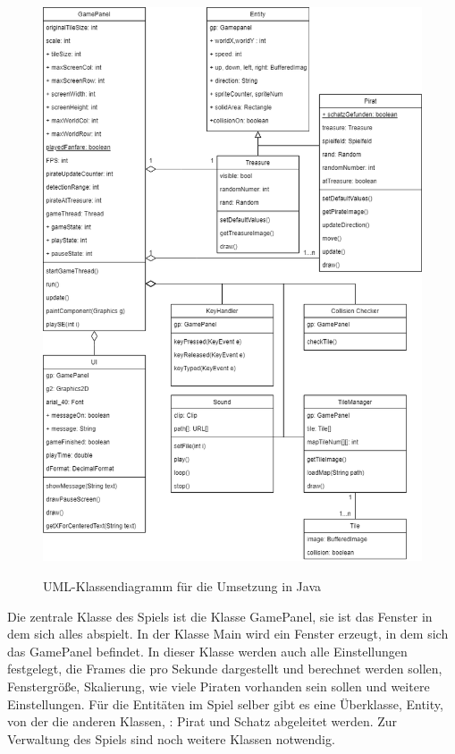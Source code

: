 \documentclass[
	12pt, %
	a4paper,
	listof=totoc, %
	bibliography=totoc, %
	numbers=noenddot, %
	ngerman, %
	headsepline, %
	oneside %
	]{scrbook} %
\begin{document}
\begin{figure}[H]
  \centering
  \includegraphics[scale=0.4]{bilder/UML_Klassendiagramm_Java.png}
  \label{fig:UML_Klassendiagramm_Java}       %
  \caption[UML-Klassendiagramm für die Umsetzung in Java]{UML-Klassendiagramm für die Umsetzung in Java}    %
\end{figure}

Die zentrale Klasse des Spiels ist die Klasse GamePanel, sie ist das Fenster in dem sich alles abspielt. In der Klasse Main wird ein Fenster erzeugt, in dem sich das GamePanel befindet. In dieser Klasse werden auch alle Einstellungen festgelegt, die Frames die pro Sekunde dargestellt und berechnet werden sollen, Fenstergröße, Skalierung, wie viele Piraten vorhanden sein sollen und weitere Einstellungen.  
Für die Entitäten im Spiel selber gibt es eine Überklasse, Entity, von der die anderen Klassen, : Pirat und Schatz abgeleitet werden.  
Zur Verwaltung des Spiels sind noch weitere Klassen notwendig.
\end{document}
